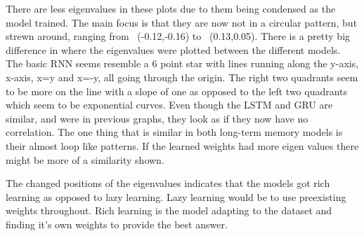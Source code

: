 \documentclass{article}
\begin{document}
There are less eigenvalues in these plots due to them being condensed as the model trained. The main focus is that they are now not in a circular pattern, but strewn around, ranging from ~(-0.12,-0.16) to ~(0.13,0.05). There is a pretty big difference in where the eigenvalues were plotted between the different models. The basic RNN seems resemble a 6 point star with lines running along the y-axis, x-axis, x=y and x=-y, all going through the origin. The right two quadrants seem to be more on the line with a slope of one as opposed to the left two quadrants which seem to be exponential curves. Even though the LSTM and GRU are similar, and were in previous graphs, they look as if they now have no correlation. The one thing that is similar in both long-term memory models is their almost loop like patterns. If the learned weights had more eigen values there might be more of a similarity shown.
\par\noindent{}
The changed positions of the eigenvalues indicates that the models got rich learning as opposed to lazy learning\cite{FLESCH20221258}. Lazy learning would be to use preexisting weights throughout. Rich learning is the model adapting to the dataset and finding it's own weights to provide the best answer.
\end{document}
